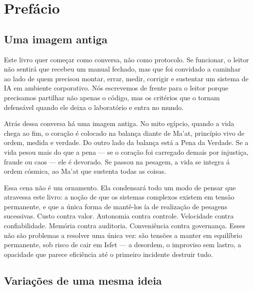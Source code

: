 \chapter*{Pref\'acio}

\section*{Uma imagem antiga}

Este livro quer come\c{c}ar como conversa, n\~ao como protocolo. Se
funcionar, o leitor n\~ao sentir\'a que recebeu um manual fechado, mas
que foi convidado a caminhar ao lado de quem precisou montar, errar,
medir, corrigir e sustentar um sistema de IA em ambiente corporativo.
N\'os escrevemos de frente para o leitor porque precisamos partilhar
n\~ao apenas o c\'odigo, mas os crit\'erios que o tornam defens\'avel
quando ele deixa o laborat\'orio e entra no mundo.

Atr\'as dessa conversa h\'a uma imagem antiga. No mito eg\'ipcio,
quando a vida chega ao fim, o cora\c{c}\~ao \'e colocado na balan\c{c}a
diante de Ma'at, princ\'ipio vivo de ordem, medida e verdade. Do outro
lado da balan\c{c}a est\'a a Pena da Verdade. Se a vida pesou mais
do que a pena --- se o cora\c{c}\~ao foi carregado demais por injusti\c{c}a,
fraude ou caos --- ele \'e devorado. Se passou na pesagem, a vida se
integra \'a ordem c\'osmica, ao Ma'at que sustenta todas as coisas.

Essa cena n\~ao \'e um ornamento. Ela condensar\'a todo um modo de pensar
que atravessa este livro: a no\c{c}\~ao de que os sistemas complexos
existem em tens\~ao permanente, e que a \'unica forma de mant\^e-los \'ia
de realiza\c{c}\~ao de pesagens sucessivas. Custo contra valor.
Autonomia contra controle. Velocidade contra confiabilidade. Mem\'oria
contra auditoria. Conveni\^encia contra governan\c{c}a. Esses n\~ao s\~ao
problemas a resolver uma \'unica vez: s\~ao tens\~oes a manter em
equil\'ibrio permanente, sob risco de cair em Isfet --- a desordem, o
improviso sem lastro, a opacidade que parece efici\^encia at\'e o
primeiro incidente destruir tudo.

\section*{Variações de uma mesma ideia}

